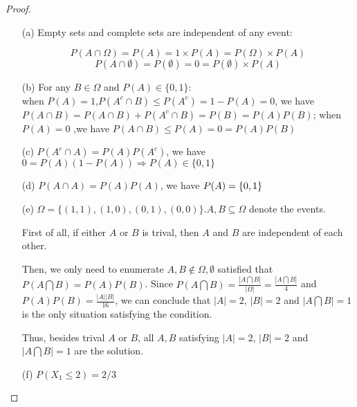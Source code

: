 \begin{proof}
\begin{enumerate}
    \item[(a)]Empty sets and complete sets are independent of any event:

$$P(A\cap\Omega)=P(A)=1\times P(A)=P(\Omega)\times P(A)$$
$$P(A\cap\emptyset)=P(\emptyset)=0=P(\emptyset)\times P(A)$$

\item[(b)]
For any $B\in\Omega$ and $P(A)\in\{0,1\}$:\\
when $P(A)=1$,$P(A^c \cap B)\leq P(A^c) = 1-P(A) =0$, we have $P(A \cap B) = P(A \cap B) + P(A^c \cap B) = P(B) = P(A)P(B)$; when $P(A)=0$ ,we have $P(A \cap B)\leq P(A) =0=P(A)P(B)$

\item[(c)]$P(A^c \cap A) = P(A)P(A^c)$,
we have $0=P(A)(1-P(A))\Rightarrow P(A)\in\{0,1\}$

\item[(d)]$P(A \cap A) = P(A)P(A)$, we have $P(A)=\left\{ 0,1 \right\}$

\item[(e)]$\Omega=\{(1,1),(1,0),(0,1),(0,0)\}. A,B \subseteq \Omega$ denote the events.
  
First of all, if either $A$ or $B$ is trival, then $A$ and $B$ are independent of each other. 

Then, we only need to enumerate $A,B\notin {\Omega, \emptyset}$ satisfied that $P(A\bigcap B) = P(A)P(B)$. 
Since $P(A\bigcap B) = \frac{|A\bigcap B|}{|\Omega|} = \frac{|A \bigcap B|}{4}$ and $P(A)P(B) = \frac{|A||B|}{16}$, we can conclude that $|A| = 2$, $|B| = 2$ and $|A\bigcap B| = 1$ is the only situation satisfying the condition. 

Thus, besides trival $A$ or $B$, all $A, B$ satisfying $|A| = 2$, $|B| = 2$ and $|A\bigcap B| = 1$ are the solution. 

\iffalse
Just verify that each case is independent :$P(A=1,B=1)=\frac{1}{4}=\frac{1}{2} *\frac{1}{2}=P(A)P(B)$

$P(A=1,B=0)=\frac{1}{4}=\frac{1}{2} *\frac{1}{2}=P(A)P(B)$

$P(A=0,B=1)=\frac{1}{4}=\frac{1}{2} *\frac{1}{2}=P(A)P(B)$

$P(A=0,B=0)=\frac{1}{4}=\frac{1}{2} *\frac{1}{2}=P(A)P(B)$
\fi

\item[(f)]$P(X_1 \leq 2)=2/3$


\end{enumerate}
\end{proof}

